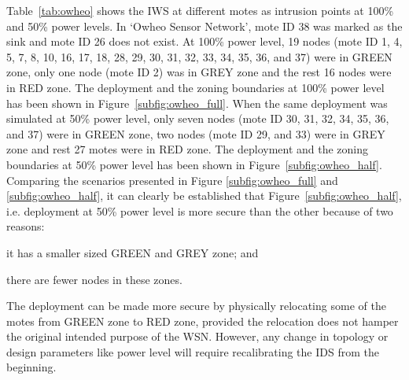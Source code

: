 \documentclass[conference,final]{IEEEtran}
\newcommand{\notedme}[1]{\raisebox{0pt}[0pt][0pt]{\pdfcomment[open=true,color=blue]{#1}}}
\begin{document}
Table~\ref{tab:owheo} shows the IWS at different motes as intrusion points at 100\% and 50\% power levels. 
In `Owheo Sensor Network', mote ID 38 was marked as the sink and mote ID 26 does not exist.
At 100\% power level, 19 nodes (mote ID 1, 4, 5, 7, 8, 10, 16, 17, 18, 28, 29, 30, 31, 32, 33, 34, 35, 36, and 37) were in GREEN zone, only one node (mote ID 2) was in GREY zone and the rest 16 nodes were in RED zone.
The deployment and the zoning boundaries at 100\% power level has been shown in Figure~\ref{subfig:owheo_full}.
When the same deployment was simulated at 50\% power level, only seven nodes (mote ID 30, 31, 32, 34, 35, 36, and 37) were in GREEN zone, two nodes (mote ID 29, and 33) were in GREY zone and rest 27 motes were in RED zone.
The deployment and the zoning boundaries at 50\% power level has been shown in Figure~\ref{subfig:owheo_half}.
Comparing the scenarios presented in  Figure \ref{subfig:owheo_full} and \ref{subfig:owheo_half}, it can clearly be established that Figure~\ref{subfig:owheo_half}, i.e. deployment at 50\% power level is more secure than the other because of two reasons:
\begin{inparaenum}
\item it has a smaller sized GREEN and GREY zone; and 
\item there are fewer nodes in these zones. 
\end{inparaenum}
The deployment can be made more secure by physically relocating some of the motes from GREEN zone to RED zone, provided the relocation does not hamper the original intended purpose of the WSN.
However, any change in topology or design parameters like power level will require recalibrating the IDS from the beginning. 
\end{document}
